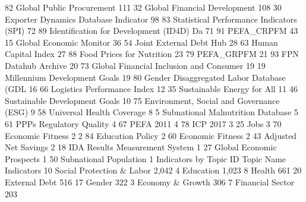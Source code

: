    82    Global Public Procurement                         111
   32    Global Financial Development                      108
   30    Exporter Dynamics Database {\ENDASH} Indicator             98
   83    Statistical Performance Indicators (SPI)           72
   89    Identification for Development (ID4D) Da           71
   91    PEFA_CRPFM                                         43
   15    Global Economic Monitor                            36
   54    Joint External Debt Hub                            28
   63    Human Capital Index                                27
   88    Food Prices for Nutrition                          23
   79    PEFA_GRPFM                                         21
   93    FPN Datahub Archive                                20
   73    Global Financial Inclusion and Consumer            19
   19    Millennium Development Goals                       19
   80    Gender Disaggregated Labor Database (GDL           16
   66    Logistics Performance Index                        12
   35    Sustainable Energy for All                         11
   46    Sustainable Development Goals                      10
   75    Environment, Social and Governance (ESG)            9
   58    Universal Health Coverage                           8
   5     Subnational Malnutrition Database                   5
   61    PPPs Regulatory Quality                             4
   67    PEFA 2011                                           4
   78    ICP 2017                                            3
   25    Jobs                                                3
   70    Economic Fitness 2                                  2
   84    Education Policy                                    2
   60    Economic Fitness                                    2
   43    Adjusted Net Savings                                2
   18    IDA Results Measurement System                      1
   27    Global Economic Prospects                           1
   50    Subnational Population                              1
{\smallskip}
  Indicators by Topic
{\smallskip}
   ID    Topic Name                                   Indicators
   10    Social Protection \& Labor                       2,042
   4     Education                                       1,023
   8     Health                                            661
   20    External Debt                                     516
   17    Gender                                            322
   3     Economy \& Growth                                  306
   7     Financial Sector                                  203
